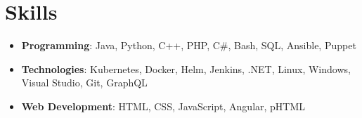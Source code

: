 \documentclass[letterpaper,10pt]{article}
\newcommand{\resumeItem}[2]{
  \item\small{
    \textbf{#1}{: #2 \vspace{-2pt}}
  }
}
\newcommand{\resumeSubItem}[2]{\resumeItem{#1}{#2}\vspace{-4pt}}
\newcommand{\resumeSubHeadingListStart}{\begin{itemize}[leftmargin=*]}
\newcommand{\resumeSubHeadingListEnd}{\end{itemize}}
\begin{document}
\section{Skills}
  \resumeSubHeadingListStart
    \resumeSubItem{Programming}
      {Java, Python, C++, PHP, C\#, Bash, SQL, Ansible, Puppet}
    \resumeSubItem{Technologies}
      {Kubernetes, Docker, Helm, Jenkins, .NET, Linux, Windows, Visual Studio, Git, GraphQL}
    \resumeSubItem{Web Development}
      {HTML, CSS, JavaScript, Angular, pHTML}
  \resumeSubHeadingListEnd
\end{document}
